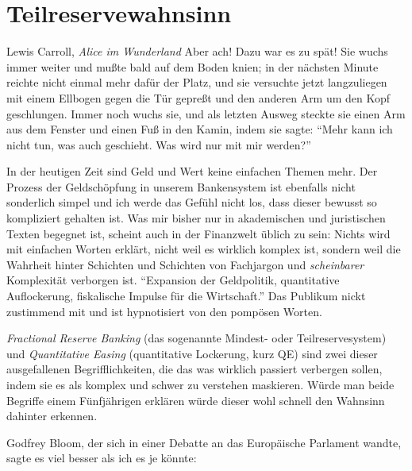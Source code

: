 \chapter{Teilreservewahnsinn}
\label{les:13}

\begin{chapquote}{Lewis Carroll, \textit{Alice im Wunderland}}
Aber ach! Dazu war es zu spät! Sie wuchs immer weiter und mußte bald auf dem
Boden knien; in der nächsten Minute reichte nicht einmal mehr dafür der Platz,
und sie versuchte jetzt langzuliegen mit einem Ellbogen gegen die Tür gepreßt
und den anderen Arm um den Kopf geschlungen. Immer noch wuchs sie, und als
letzten Ausweg steckte sie einen Arm aus dem Fenster und einen Fuß in den Kamin,
indem sie sagte: \enquote{Mehr kann ich nicht tun, was auch geschieht. Was wird
nur mit mir werden?}
\end{chapquote}

In der heutigen Zeit sind Geld und Wert keine einfachen Themen mehr. Der Prozess
der Geldschöpfung in unserem Bankensystem ist ebenfalls nicht sonderlich simpel
und ich werde das Gefühl nicht los, dass dieser bewusst so kompliziert gehalten
ist. Was mir bisher nur in akademischen und juristischen Texten begegnet ist,
scheint auch in der Finanzwelt üblich zu sein: Nichts wird mit einfachen Worten
erklärt, nicht weil es wirklich komplex ist, sondern weil die Wahrheit hinter
Schichten und Schichten von Fachjargon und \textit{scheinbarer} Komplexität
verborgen ist. \enquote{Expansion der Geldpolitik, quantitative Auflockerung,
fiskalische Impulse für die Wirtschaft.} Das Publikum nickt zustimmend mit und
ist hypnotisiert von den pompösen Worten.

\textit{Fractional Reserve Banking} (das sogenannte Mindest- oder
Teilreservesystem) und \textit{Quantitative Easing} (quantitative Lockerung,
kurz QE) sind zwei dieser ausgefallenen Begrifflichkeiten, die das was wirklich
passiert verbergen sollen, indem sie es als komplex und schwer zu verstehen
maskieren. Würde man beide Begriffe einem Fünfjährigen erklären würde dieser
wohl schnell den Wahnsinn dahinter erkennen.

Godfrey Bloom, der sich in einer Debatte an das Europäische Parlament wandte,
sagte es viel besser als ich es je könnte:

